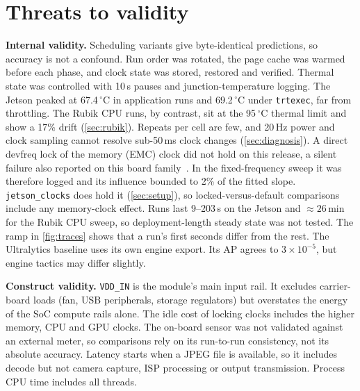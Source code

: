 \section{Threats to validity}
\label{sec:threats}

\textbf{Internal validity.}
Scheduling variants give byte-identical predictions, so accuracy is
not a confound. Run order was rotated, the page cache was warmed before
each phase, and clock state was stored, restored and verified. Thermal state was controlled with 10\,s pauses and
junction-temperature logging. The Jetson peaked at
67.4\,$^\circ$C in application runs and 69.2\,$^\circ$C under
\texttt{trtexec}, far from throttling. The Rubik CPU runs, by contrast,
sit at the 95\,$^\circ$C thermal limit and show a 17\% drift
(\cref{sec:rubik}). Repeats per cell are few, and 20\,Hz power and
clock sampling cannot resolve sub-50\,ms clock changes
(\cref{sec:diagnosis}). A direct devfreq lock of the memory (EMC) clock
did not hold on this release, a silent failure also reported on this
board family~\cite{kang2026emc}. In the fixed-frequency sweep it was
therefore logged and its influence bounded to 2\% of the fitted slope. \texttt{jetson\_clocks} does hold it
(\cref{sec:setup}), so locked-versus-default comparisons include any
memory-clock effect. Runs last 9--203\,s on the Jetson and
${\approx}26$\,min for the Rubik CPU sweep, so deployment-length steady state
was not tested. The ramp in \cref{fig:traces} shows that a run's first
seconds differ from the rest. The Ultralytics baseline uses its
own engine export. Its AP agrees to $3\times10^{-5}$, but engine
tactics may differ slightly.

\textbf{Construct validity.}
\texttt{VDD\_IN} is the module's main input rail. It excludes
carrier-board loads (fan, USB peripherals, storage regulators) but
overstates the energy of the SoC compute rails alone.
The idle cost of locking clocks includes the higher memory, CPU and
GPU clocks. The on-board sensor was not validated against
an external meter, so comparisons rely on its run-to-run
consistency, not its absolute accuracy. Latency starts when a
JPEG file is available, so it includes decode but not camera capture,
ISP processing or output transmission. Process CPU time
includes all threads.

